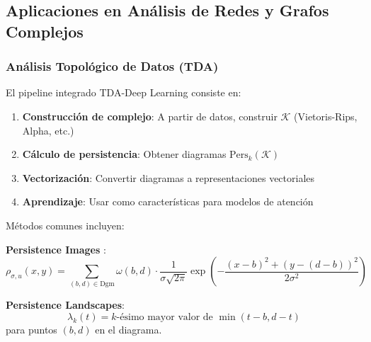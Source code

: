 \subsection{Aplicaciones en Análisis de Redes y Grafos Complejos}

\subsubsection{Análisis Topológico de Datos (TDA)}

\begin{definition}\label{def:pipeline_tda_dl}
El pipeline integrado TDA-Deep Learning consiste en:
\begin{enumerate}
    \item \textbf{Construcción de complejo}: A partir de datos, construir $\mathcal{K}$ (Vietoris-Rips, Alpha, etc.)
    \item \textbf{Cálculo de persistencia}: Obtener diagramas $\text{Pers}_k(\mathcal{K})$
    \item \textbf{Vectorización}: Convertir diagramas a representaciones vectoriales
    \item \textbf{Aprendizaje}: Usar como características para modelos de atención
\end{enumerate}
\end{definition}

\begin{definition}\label{def:representaciones_persistencia}
Métodos comunes incluyen:

\textbf{Persistence Images} \citep{adams2017persistence}:
\begin{equation}
    \rho_{\sigma,u}(x,y) = \sum_{(b,d) \in \text{Dgm}} \omega(b,d) \cdot \frac{1}{\sigma\sqrt{2\pi}} \exp\left(-\frac{(x-b)^2 + (y-(d-b))^2}{2\sigma^2}\right)
\end{equation}

\textbf{Persistence Landscapes}:
\begin{equation}
    \lambda_k(t) = k\text{-ésimo mayor valor de } \min(t-b, d-t)
\end{equation}
para puntos $(b,d)$ en el diagrama.
\end{definition}

